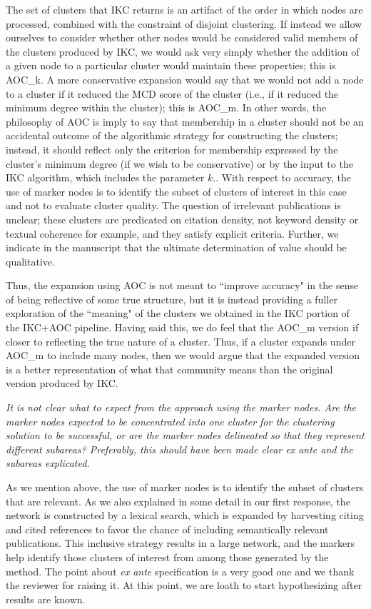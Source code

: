 \documentclass[11pt, oneside]{article}   	%
\begin{document}
{The set of clusters that IKC returns is an artifact of the order in which nodes are processed, combined with the constraint of disjoint clustering. If instead we allow ourselves to consider whether other nodes would be considered valid members of the clusters produced by IKC, we would ask very simply whether the addition of a given node to a particular cluster would maintain these properties; this is AOC\_k.  A more conservative expansion would say that we would not add a node to a cluster if it reduced the MCD score of the cluster (i.e., if it reduced the minimum degree within the cluster); this is AOC\_{m}.  In other words, the philosophy of AOC is imply to say that membership in a cluster should not be an accidental outcome of the algorithmic strategy for constructing the clusters; instead, it should reflect only the criterion for membership expressed by the cluster's minimum degree (if we wish to be conservative) or by the input to the IKC algorithm, which includes the parameter $k$.}. With respect to accuracy, the  use of marker nodes is to identify the subset of clusters of interest in this case and not to evaluate cluster quality. The question of irrelevant publications is unclear; these clusters are predicated on citation density, not keyword density or textual coherence for example, and they satisfy explicit criteria. Further, we indicate in the manuscript that the ultimate determination of value should be qualitative.

Thus, the expansion using AOC is not meant to ``improve accuracy" in the sense of being reflective of some true structure, but it is instead providing a fuller exploration of the ``meaning" of the clusters we obtained in the IKC portion of the IKC+AOC pipeline.  Having said this, we do feel that the AOC\_{m} version if closer to reflecting the true nature of a cluster. Thus, if a cluster expands under AOC\_{m}  to include many nodes, then we would argue that the expanded version  is a better representation of what that community means than the original version produced by IKC. 

\vspace{2 mm}  
\emph{It is not clear what to expect from the approach using the marker nodes. Are the marker nodes expected to be concentrated into one cluster for the clustering solution to be successful, or are the marker nodes delineated so that they represent different subareas? Preferably, this should have been made clear ex ante and the subareas explicated.}

\vspace{2 mm}  
As we mention above, the use of marker nodes is to identify the subset of clusters that are relevant. As we also explained in some detail in our first response, the network is constructed by a lexical search, which is expanded by harvesting citing and cited references to favor the chance of including semantically relevant publications. This inclusive strategy results in a large network, and the markers help identify those clusters of interest from among those generated by the method. The point about \emph{ex ante} specification is a very good one and we thank the reviewer for raising it. At this point, we are loath to start hypothesizing after results are known. 
\end{document}
